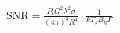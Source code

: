 \documentclass[preview]{standalone}
\begin{document}
\begin{align*}
\text{SNR} = \frac{P_t G^2 \lambda^2 \sigma}{(4 \pi)^3 R^4} \cdot \frac{1}{k T_s B_n F}
\end{align*}
\end{document}
